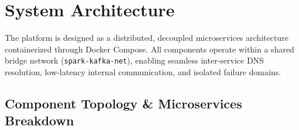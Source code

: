 \documentclass[11pt,a4paper]{article}
\begin{document}
\newpage
\section{System Architecture}

The platform is designed as a distributed, decoupled microservices architecture containerized through Docker Compose. All components operate within a shared bridge network (\texttt{spark-kafka-net}), enabling seamless inter-service DNS resolution, low-latency internal communication, and isolated failure domains.

\subsection{Component Topology \& Microservices Breakdown}
\end{document}
